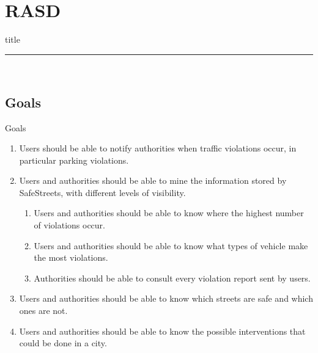 \section{RASD}

	\begin{frame}[plain]
		\vfill
		\centering
		\begin{beamercolorbox}[sep=8pt,center,shadow=true,rounded=true]{title}
			\textbf{\insertsectionhead}\par%
			\color{polimiblue}\noindent\rule{10cm}{1pt} \\
		\end{beamercolorbox}
		\vfill
	\end{frame}

	\subsection{Goals}
		\begin{frame}{Goals}
			\vspace{-17pt}
			\begin{enumerate}[label=\textbf{G\arabic*}]\small
				\item \label{goal:notification} Users should be able to notify authorities when traffic violations occur, in particular parking violations.
				\item \label{goal:mining} Users and authorities should be able to mine the information stored by SafeStreets, with different levels of visibility.
				\begin{enumerate}[label=\textbf{G2\Alph*}]
					\item \label{goal:miningA} Users and authorities should be able to know where the highest number of violations occur.
					\item \label{goal:miningB} Users and authorities should be able to know what types of vehicle make the most violations.
					\item \label{goal:miningC} Authorities should be able to consult every violation report sent by users.
				\end{enumerate}
				\item \label{goal:safety} Users and authorities should be able to know which streets are safe and which ones are not.
				\item \label{goal:intervention} Users and authorities should be able to know the possible interventions that could be done in a city.
			\end{enumerate}
		\end{frame}


